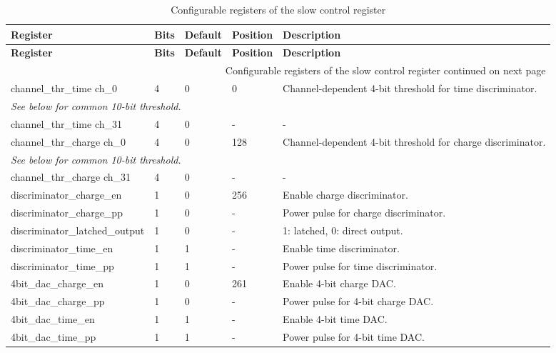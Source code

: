 \begin{longtable}{|p{6cm}|p{1cm}|p{1.4cm}|p{1.8cm}|p{5cm}|}
    
    \caption{Configurable registers of the slow control register\autocite{InternalcommunicationKarl} \label{tab:slow_control_register}} \\ \hline
    \hline
\textbf{Register} & \textbf{Bits} & \textbf{Default} & \textbf{Position} & \textbf{Description} \\ \hline
\endfirsthead

\hline
\textbf{Register} & \textbf{Bits} & \textbf{Default} & \textbf{Position } & \textbf{Description} \\ \hline
\endhead

\hline
\multicolumn{5}{r}{{Configurable registers of the slow control register continued on next page}} \\
\endfoot

\hline
\endlastfoot

channel\_thr\_time ch\_0       & 4  & 0 & 0   & Channel-dependent 4-bit threshold for time discriminator. \\ \hline
\multicolumn{5}{|l|}{\emph{See below for common 10-bit threshold.}} \\ \hline
channel\_thr\_time ch\_31      & 4  & 0 & -   & - \\ \hline

channel\_thr\_charge ch\_0     & 4  & 0 & 128 & Channel-dependent 4-bit threshold for charge discriminator. \\ \hline
\multicolumn{5}{|l|}{\emph{See below for common 10-bit threshold.}} \\ \hline
channel\_thr\_charge ch\_31    & 4  & 0 & -   & - \\ \hline

discriminator\_charge\_en      & 1  & 0 & 256 & Enable charge discriminator. \\ \hline
discriminator\_charge\_pp      & 1  & 0 & -   & Power pulse for charge discriminator. \\ \hline
discriminator\_latched\_output & 1  & 0 & -   & 1: latched, 0: direct output. \\ \hline
discriminator\_time\_en        & 1  & 1 & -   & Enable time discriminator. \\ \hline
discriminator\_time\_pp        & 1  & 1 & -   & Power pulse for time discriminator. \\ \hline

4bit\_dac\_charge\_en          & 1  & 0 & 261   & Enable 4-bit charge DAC. \\ \hline
4bit\_dac\_charge\_pp          & 1  & 0 & -   & Power pulse for 4-bit charge DAC. \\ \hline
4bit\_dac\_time\_en            & 1  & 1 & -   & Enable 4-bit time DAC. \\ \hline
4bit\_dac\_time\_pp            & 1  & 1 & -   & Power pulse for 4-bit time DAC. \\ \hline


\end{longtable}
